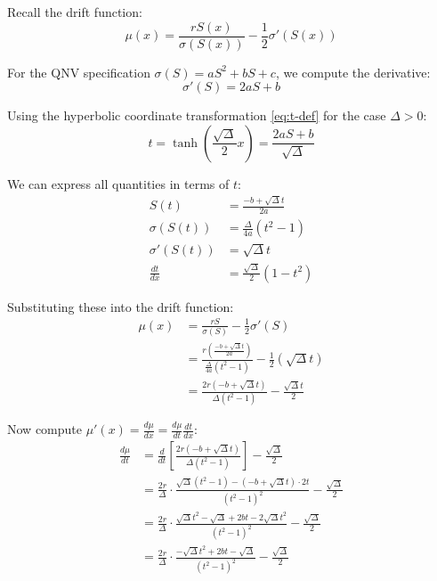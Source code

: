 \documentclass[a4paper,11pt]{article}
\begin{document}
Recall the drift function:
\begin{equation}
\mu(x) = \frac{rS(x)}{\sigma(S(x))} - \frac{1}{2}\sigma'(S(x))
\end{equation}

For the QNV specification $\sigma(S) = aS^2 + bS + c$, we compute the derivative:
\begin{equation}
\sigma'(S) = 2aS + b
\end{equation}

Using the hyperbolic coordinate transformation \eqref{eq:t-def} for the case $\Delta > 0$:
\begin{equation}
t = \tanh\left(\frac{\sqrt{\Delta}}{2}x\right) = \frac{2aS + b}{\sqrt{\Delta}}
\end{equation}

We can express all quantities in terms of $t$:
\begin{align}
S(t) &= \frac{-b + \sqrt{\Delta}t}{2a} \\
\sigma(S(t)) &= \frac{\Delta}{4a}(t^2 - 1) \\
\sigma'(S(t)) &= \sqrt{\Delta}t \\
\frac{dt}{dx} &= \frac{\sqrt{\Delta}}{2}(1 - t^2)
\end{align}

Substituting these into the drift function:
\begin{align}
\mu(x) &= \frac{rS}{\sigma(S)} - \frac{1}{2}\sigma'(S) \\
&= \frac{r\left(\frac{-b + \sqrt{\Delta}t}{2a}\right)}{\frac{\Delta}{4a}(t^2 - 1)} - \frac{1}{2}(\sqrt{\Delta}t) \\
&= \frac{2r(-b + \sqrt{\Delta}t)}{\Delta(t^2 - 1)} - \frac{\sqrt{\Delta}t}{2}
\end{align}

Now compute $\mu'(x) = \frac{d\mu}{dx} = \frac{d\mu}{dt}\frac{dt}{dx}$:
\begin{align}
\frac{d\mu}{dt} &= \frac{d}{dt}\left[\frac{2r(-b + \sqrt{\Delta}t)}{\Delta(t^2 - 1)}\right] - \frac{\sqrt{\Delta}}{2} \\
&= \frac{2r}{\Delta}\cdot\frac{\sqrt{\Delta}(t^2 - 1) - (-b + \sqrt{\Delta}t)\cdot 2t}{(t^2 - 1)^2} - \frac{\sqrt{\Delta}}{2} \\
&= \frac{2r}{\Delta}\cdot\frac{\sqrt{\Delta}t^2 - \sqrt{\Delta} + 2bt - 2\sqrt{\Delta}t^2}{(t^2 - 1)^2} - \frac{\sqrt{\Delta}}{2} \\
&= \frac{2r}{\Delta}\cdot\frac{-\sqrt{\Delta}t^2 + 2bt - \sqrt{\Delta}}{(t^2 - 1)^2} - \frac{\sqrt{\Delta}}{2}
\end{align}
\end{document}
